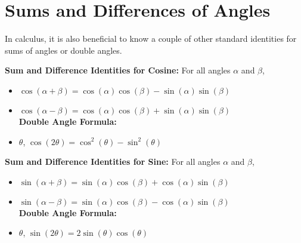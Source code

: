 \documentclass{ximera}
\begin{document}

\section{Sums and Differences of Angles}

In calculus, it is also beneficial to know a couple of other standard identities for sums of angles or double angles. 

\begin{callout}
\textbf{Sum and Difference Identities for Cosine:} For all angles $\alpha$ and $\beta$, 
\begin{itemize}

\item  $\cos(\alpha + \beta) = \cos(\alpha) \cos(\beta) - \sin(\alpha) \sin(\beta)$

\item $\cos(\alpha - \beta) = \cos(\alpha) \cos(\beta) + \sin(\alpha) \sin(\beta)$\\

\textbf{Double Angle Formula:}
\item  \(\theta\), \(\cos(2\theta) = \cos^2(\theta) - \sin^2(\theta)\)

\end{itemize}
\end{callout}


\begin{callout}
 \textbf{Sum and Difference Identities for Sine:} For all angles $\alpha$ and $\beta$, 
\begin{itemize}

\item  $\sin(\alpha + \beta) = \sin(\alpha) \cos(\beta) + \cos(\alpha) \sin(\beta)$

\item $\sin(\alpha - \beta) = \sin(\alpha) \cos(\beta) - \cos(\alpha) \sin(\beta)$\\

\textbf{Double Angle Formula:}
\item \(\theta\), \(\sin(2\theta) = 2\sin(\theta)\cos(\theta)\)

\end{itemize}
\end{callout}
\end{document}
